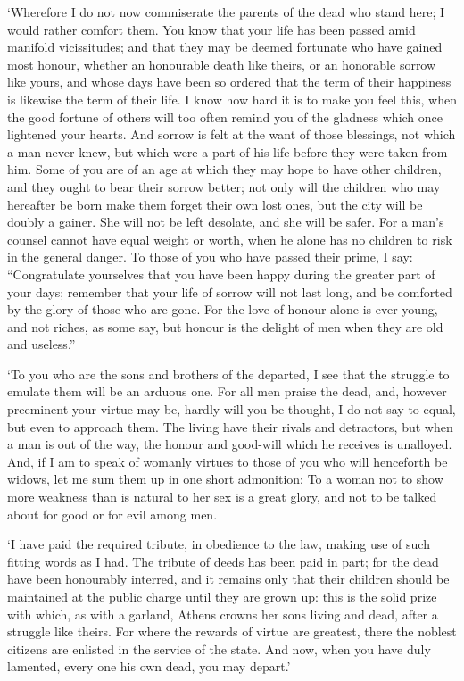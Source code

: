 `Wherefore I do not now commiserate the parents of the dead who stand
here; I would rather comfort them. You know that your life has been
passed amid manifold vicissitudes; and that they may be deemed
fortunate who have gained most honour, whether an honourable death
like theirs, or an honorable sorrow like yours, and whose days have
been so ordered that the term of their happiness is likewise the term
of their life. I know how hard it is to make you feel this, when the
good fortune of others will too often remind you of the gladness which
once lightened your hearts. And sorrow is felt at the want of those
blessings, not which a man never knew, but which were a part of his
life before they were taken from him. Some of you are of an age at
which they may hope to have other children, and they ought to bear
their sorrow better; not only will the children who may hereafter be
born make them forget their own lost ones, but the city 
will be doubly a gainer. She will not be left desolate, and she will
be safer. For a man's counsel cannot have equal weight or worth, when
he alone has no children to risk in the general danger. To those of
you who have passed their prime, I say: ``Congratulate yourselves that
you have been happy during the greater part of your days; remember
that your life of sorrow will not last long, and be comforted by the
glory of those who are gone. For the love of honour alone is ever
young, and not riches, as some say, but honour is the delight of men
when they are old and useless.''

`To you who are the sons and brothers of the departed, I see that the
struggle to emulate them will be an arduous one. For all men praise
the dead, and, however preeminent your virtue may be, hardly will you
be thought, I do not say to equal, but even to approach them. The
living have their rivals and detractors, but when a man is out of the
way, the honour and good-will which he receives is unalloyed. And, if
I am to speak of womanly virtues to those of you who will henceforth
be widows, let me sum them up in one short admonition: To a woman not
to show more weakness than is natural to her sex is a great glory, and
not to be talked about for good or for evil among men.

`I have paid the required tribute, in obedience to the law, making use
of such fitting words as I had. The tribute of deeds has been paid in
part; for the dead have been honourably interred, and it remains only
that their children should be maintained at the public charge until
they are grown up: this is the solid prize with which, as with a
garland, Athens crowns her sons living and dead, after a struggle like
theirs. For where the rewards of virtue are greatest, there the
noblest citizens  are enlisted in the service of the state.
And now, when you have duly lamented, every one his own dead, you may
depart.'

